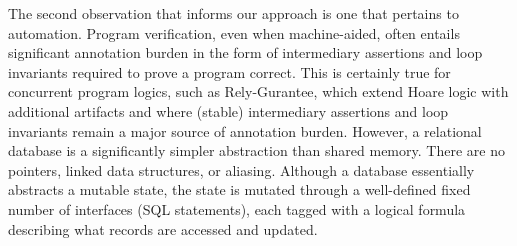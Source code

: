 
The second observation that informs our approach is one that pertains
to automation. Program verification, even when machine-aided, often
entails significant annotation burden in the form of intermediary
assertions and loop invariants required to prove a program correct.
This is certainly true for concurrent program logics, such as
Rely-Gurantee, which extend Hoare logic with additional artifacts and
where (stable) intermediary assertions and loop invariants remain a
major source of annotation burden.  However, a relational database is
a significantly simpler abstraction than shared memory. There are no
pointers, linked data structures, or aliasing.  Although a database
essentially abstracts a mutable state, the state is mutated through a
well-defined fixed number of interfaces (SQL statements), each tagged
with a logical formula describing what records are accessed and
updated.


